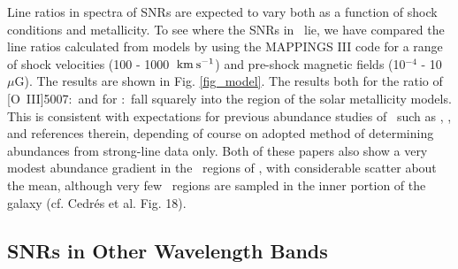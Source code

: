 
Line ratios in spectra of SNRs are expected to vary both as a function of shock conditions and metallicity.  To see where the SNRs in \gal\ lie, we have compared the line ratios calculated from models by \cite{allen08} using the MAPPINGS III code for a range of shock velocities (100 - 1000 $\:{\rm km\:s^{-1}}$) and pre-shock magnetic fields (10$^{-4}$ - 10 $\mu$G).  The results are shown in Fig. \ref{fig_model}.  The results both for the ratio of [O~III]5007:\hb\ and for \sii:\ha\ fall squarely into the region of the solar metallicity models. This is consistent with expectations for previous abundance studies of \gal\ such as \citet{cedres12}, \citet{gusev13}, and references therein, depending of course on adopted method of determining abundances from strong-line data only. Both of these papers also show a very modest abundance gradient in the \hii\ regions of \gal, with considerable scatter about the mean, although very few \hii\ regions are sampled in the inner portion of the galaxy (cf. {Cedr{\'e}s} et al. Fig. 18).

\subsection{SNRs in Other Wavelength Bands}

